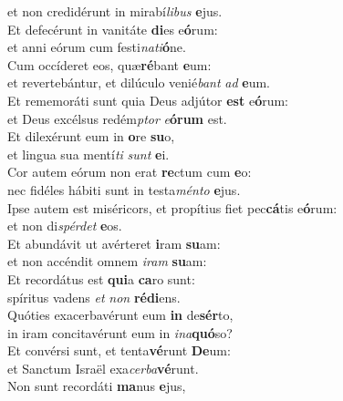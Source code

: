 \evenverse et non credidérunt in mirabí\textit{li}\textit{bus} \textbf{e}jus.\\
\oddverse Et defecérunt in vanitáte \textbf{di}es e\textbf{ó}rum:~\*\\
\oddverse et anni eórum cum festi\textit{na}\textit{ti}\textbf{ó}ne.\\
\evenverse Cum occíderet eos, quæ\textbf{ré}bant \textbf{e}um:~\*\\
\evenverse et revertebántur, et dilúculo venié\textit{bant} \textit{ad} \textbf{e}um.\\
\oddverse Et rememoráti sunt quia Deus adjútor \textbf{est} e\textbf{ó}rum:~\*\\
\oddverse et Deus excélsus redém\textit{ptor} \textit{e}\textbf{ó}\textbf{rum} est.\\
\evenverse Et dilexérunt eum in \textbf{o}re \textbf{su}o,~\*\\
\evenverse et lingua sua mentí\textit{ti} \textit{sunt} \textbf{e}i.\\
\oddverse Cor autem eórum non erat \textbf{re}ctum cum \textbf{e}o:~\*\\
\oddverse nec fidéles hábiti sunt in testa\textit{mén}\textit{to} \textbf{e}jus.\\
\evenverse Ipse autem est miséricors, et propítius fiet pec\textbf{cá}tis e\textbf{ó}rum:~\*\\
\evenverse et non di\textit{spér}\textit{det} \textbf{e}os.\\
\oddverse Et abundávit ut avérteret \textbf{i}ram \textbf{su}am:~\*\\
\oddverse et non accéndit omnem \textit{i}\textit{ram} \textbf{su}am:\\
\evenverse Et recordátus est \textbf{qui}a \textbf{ca}ro sunt:~\*\\
\evenverse spíritus vadens \textit{et} \textit{non} \textbf{ré}\textbf{di}ens.\\
\oddverse Quóties exacerbavérunt eum \textbf{in} de\textbf{sér}to,~\*\\
\oddverse in iram concitavérunt eum in \textit{i}\textit{na}\textbf{quó}so?\\
\evenverse Et convérsi sunt, et tenta\textbf{vé}runt \textbf{De}um:~\*\\
\evenverse et Sanctum Israël exa\textit{cer}\textit{ba}\textbf{vé}runt.\\
\oddverse Non sunt recordáti \textbf{ma}nus \textbf{e}jus,~\*\\
